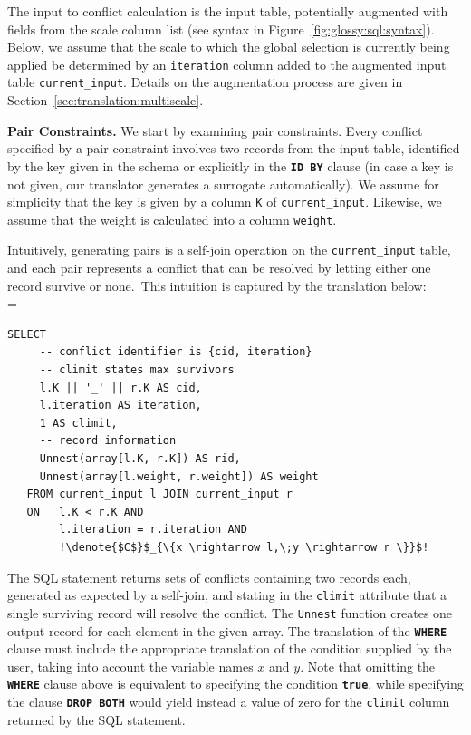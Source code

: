\documentclass[11pt, oneside]{report}
\newcommand{\minisec}[1]{\noindent\textbf{#1.}}
\newcommand{\denote}[1]{\text{$[\![ $#1$ ]\!]$}}
\begin{document}
{The input to conflict calculation is the input table, potentially augmented with fields from the scale column list (see syntax in Figure~\ref{fig:glossy:sql:syntax}). Below, we assume that the scale to which the global selection is currently being applied be determined by an \texttt{iteration} column added to the augmented input table \texttt{current\_input}. Details on the augmentation process are given in Section~\ref{sec:translation:multiscale}. 

\minisec{Pair Constraints}
We start by examining pair constraints. Every conflict specified by a pair constraint involves two records from the input table, identified by the key given in the schema or explicitly in the \textbf{\texttt{ID BY}} clause (in case a key is not given, our translator generates a surrogate automatically). We assume for simplicity that the key is given by a column \texttt{K} of \texttt{current\_input}. Likewise, we assume that the weight is calculated into a column \texttt{weight}.  

Intuitively, generating pairs is a self-join operation on the \texttt{current\_input} table, and each pair represents a conflict that can be resolved by letting either one record survive or none.~This intuition is captured by the translation below: \\

\denote{\lstinline!FOREACH PAIR!$\;x,\;y\;$\lstinline!WHERE!$\;C\;$\lstinline!DROP ONE!} =
\begin{lstlisting}[mathescape,escapechar=!]
   SELECT
     -- conflict identifier is {cid, iteration}
     -- climit states max survivors
     l.K || '_' || r.K AS cid,
     l.iteration AS iteration,
     1 AS climit,
     -- record information
     Unnest(array[l.K, r.K]) AS rid,
     Unnest(array[l.weight, r.weight]) AS weight
   FROM current_input l JOIN current_input r
   ON   l.K < r.K AND
        l.iteration = r.iteration AND
        !\denote{$C$}$_{\{x \rightarrow l,\;y \rightarrow r \}}$!
\end{lstlisting}

The SQL statement returns sets of conflicts containing two records each, generated as expected by a self-join, and stating in the \texttt{climit} attribute that a single surviving record will resolve the conflict. The \texttt{Unnest} function creates one output record for each element in the given array. The translation of the \textbf{\texttt{WHERE}} clause must include the appropriate translation of the condition supplied by the user, taking into account the variable names $x$ and $y$. Note that omitting the \textbf{\texttt{WHERE}} clause above is equivalent to specifying the condition \textbf{\texttt{true}}, while specifying the clause \textbf{\texttt{DROP BOTH}} would yield instead a value of zero for the \texttt{climit} column returned by the SQL statement.
 
}
\end{document}
